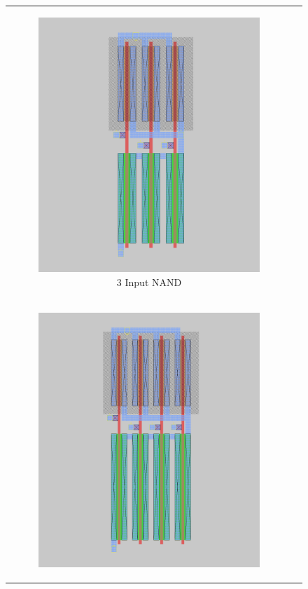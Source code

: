 \documentclass[conference]{IEEEtran}
\begin{document}
\begin{figure}[H]
\begin{tabular}{cc}
\begin{subfigure}{0.44\linewidth}
            \includegraphics[width=\textwidth]{images/nand_3_cmos_layout.png}
            \caption{3 Input NAND}
        \end{subfigure} \\
        \begin{subfigure}{0.44\linewidth}
            \centering
            \includegraphics[width=\textwidth]{images/nand_4_cmos_layout.png}

\end{subfigure}
\end{tabular}
\end{figure}
\end{document}
